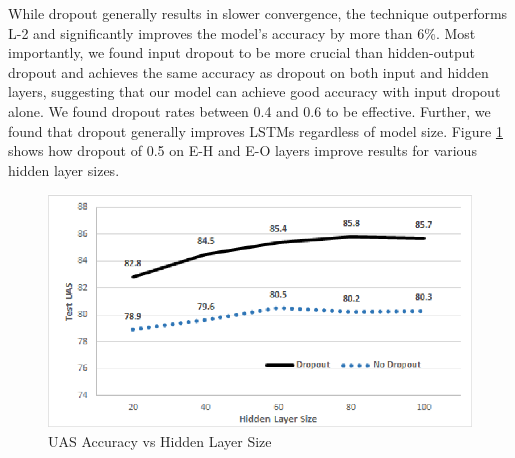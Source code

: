 While dropout generally results in slower convergence, the technique outperforms L-2 and significantly improves the model's accuracy by more than 6\%. Most importantly, we found input dropout to be more crucial than hidden-output dropout and achieves the same accuracy as dropout on both input and hidden layers, suggesting that our model can achieve good accuracy with input dropout alone. %
We found dropout rates between 0.4 and 0.6 to be effective.
Further, we found that dropout generally improves LSTMs regardless of model size. Figure \ref{fig:dropout_hidden} shows how dropout of 0.5 on E-H and E-O layers improve results for various hidden layer sizes. 

\begin{figure}[t]
\centering
  \centering
  \includegraphics[width=.9\columnwidth]{images/dropout_hidden.eps}
  \caption{UAS Accuracy vs Hidden Layer Size}
\label{fig:dropout_hidden}
\end{figure}
